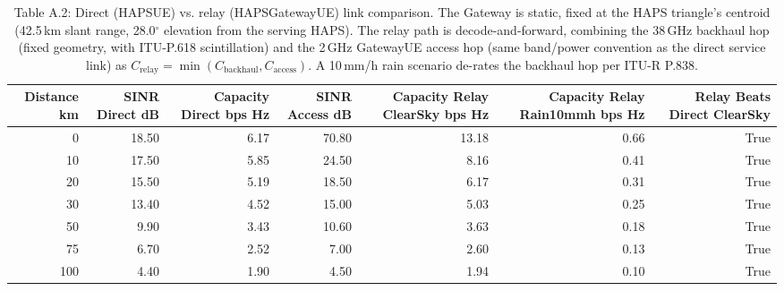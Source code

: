 \begin{table}[htbp]
\centering
\small
\begin{tabular}{rrrrrrr}
\toprule
Distance km & SINR Direct dB & Capacity Direct bps Hz & SINR Access dB & Capacity Relay ClearSky bps Hz & Capacity Relay Rain10mmh bps Hz & Relay Beats Direct ClearSky \\
\midrule
0 & 18.50 & 6.17 & 70.80 & 13.18 & 0.66 & True \\
10 & 17.50 & 5.85 & 24.50 & 8.16 & 0.41 & True \\
20 & 15.50 & 5.19 & 18.50 & 6.17 & 0.31 & True \\
30 & 13.40 & 4.52 & 15.00 & 5.03 & 0.25 & True \\
50 & 9.90 & 3.43 & 10.60 & 3.63 & 0.18 & True \\
75 & 6.70 & 2.52 & 7.00 & 2.60 & 0.13 & True \\
100 & 4.40 & 1.90 & 4.50 & 1.94 & 0.10 & True \\
\bottomrule
\end{tabular}

\caption{Table A.2: Direct (HAPS\textrightarrow UE) vs. relay (HAPS\textrightarrow Gateway\textrightarrow UE) link comparison. The Gateway is static, fixed at the HAPS triangle's centroid (42.5\,km slant range, 28.0$^\circ$ elevation from the serving HAPS). The relay path is decode-and-forward, combining the 38\,GHz backhaul hop (fixed geometry, with ITU-P.618 scintillation) and the 2\,GHz Gateway\textrightarrow UE access hop (same band/power convention as the direct service link) as $C_{\text{relay}} = \min(C_{\text{backhaul}}, C_{\text{access}})$. A 10\,mm/h rain scenario de-rates the backhaul hop per ITU-R P.838.}
\label{table:app-relay-comparison}
\end{table}
